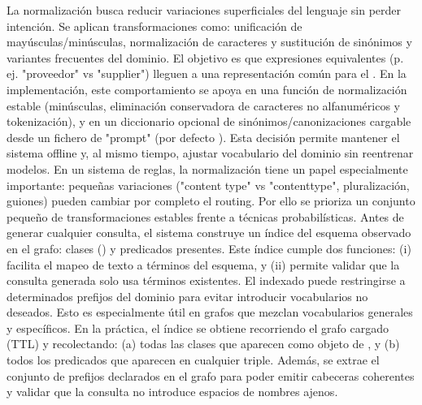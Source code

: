 {}\markdownRendererInterblockSeparator
{}\markdownRendererInterblockSeparator
{}La normalización busca reducir variaciones superficiales del lenguaje sin perder intención. Se aplican transformaciones como: unificación de mayúsculas/minúsculas, normalización de caracteres y sustitución de sinónimos y variantes frecuentes del dominio. El objetivo es que expresiones equivalentes (p. ej. "proveedor" vs "supplier") lleguen a una representación común para el .\markdownRendererInterblockSeparator
{}En la implementación, este comportamiento se apoya en una función de normalización estable (minúsculas, eliminación conservadora de caracteres no alfanuméricos y tokenización), y en un diccionario opcional de sinónimos/canonizaciones cargable desde un fichero de "prompt" (por defecto ). Esta decisión permite mantener el sistema offline y, al mismo tiempo, ajustar vocabulario del dominio sin reentrenar modelos.\markdownRendererInterblockSeparator
{}En un sistema de reglas, la normalización tiene un papel especialmente importante: pequeñas variaciones ("content type" vs "contenttype", pluralización, guiones) pueden cambiar por completo el routing. Por ello se prioriza un conjunto pequeño de transformaciones estables frente a técnicas probabilísticas.\markdownRendererInterblockSeparator
{}\markdownRendererInterblockSeparator
{}Antes de generar cualquier consulta, el sistema construye un índice del esquema observado en el grafo: clases () y predicados presentes. Este índice cumple dos funciones: (i) facilita el mapeo de texto a términos del esquema, y (ii) permite validar que la consulta generada solo usa términos existentes.\markdownRendererInterblockSeparator
{}El indexado puede restringirse a determinados prefijos del dominio para evitar introducir vocabularios no deseados. Esto es especialmente útil en grafos que mezclan vocabularios generales y específicos.\markdownRendererInterblockSeparator
{}En la práctica, el índice se obtiene recorriendo el grafo cargado (TTL) y recolectando: (a) todas las clases que aparecen como objeto de , y (b) todos los predicados que aparecen en cualquier triple. Además, se extrae el conjunto de prefijos declarados en el grafo para poder emitir cabeceras  coherentes y validar que la consulta no introduce espacios de nombres ajenos.\markdownRendererInterblockSeparator
